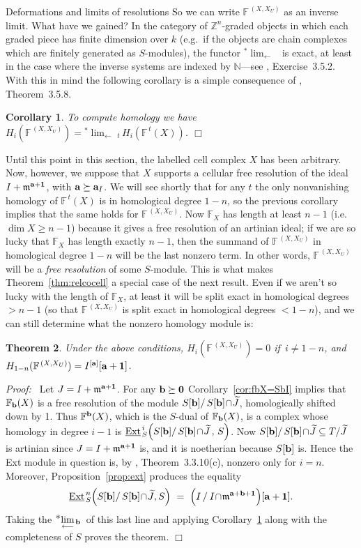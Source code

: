 \documentclass[12pt,leqno]{article}
\newtheorem{thm}{Theorem}[section]
\newtheorem{cor}[thm]{Corollary}
\def\Ast{{\textstyle \ast}}
\def\invlim#1{{{\displaystyle \lim_{\longleftarrow}}\;\!_{#1}\,}}
\def\eext{{{\underline{\rm Ext}}{\scriptscriptstyle \,}}}
\def\aa{{{\rm \bf a}}}
\def\bb{{{\rm \bf b}}}
\def\mm{{\mathfrak m}}
\def\FF{{\mathbb F}}
\def\NN{{\mathbb N}}
\def\ZZ{{\mathbb Z}}
\begin{document}
\begin{section}{Deformations and limits of resolutions}
So we can write $\FF^{\,(X,X_U)}$ as an inverse limit.  What have we
gained?  In the category of $\ZZ^n$-graded objects in which each graded
piece has finite dimension over $k$ (e.g.\ if the objects are chain
complexes which are finitely generated as $S$-modules), the functor
$^\Ast\invlim{}$ is exact, at least in the case where the inverse systems
are indexed by $\NN$---see \cite{Wei}, Exercise~3.5.2.  With this in mind
the following corollary is a simple consequence of \cite{Wei},
Theorem~3.5.8.

\begin{cor} \label{cor:homology}
To compute homology we have $H_i(\FF^{\,(X,X_U)}) =
{}^\Ast\invlim{t}H_i(\FF^{\,t}(X))$. \hfill $\Box$
\end{cor}

Until this point in this section, the labelled cell complex $X$ has been
arbitrary.  Now, however, we suppose that $X$ supports a cellular free
resolution of the ideal $I + \mm^{\aa + {\bf 1}}$, with $\aa \succeq
\aa_I$.  We will see shortly that for any $t$ the only nonvanishing
homology of $\FF^{\,t}(X)$ is in homological degree $1-n$, so the
previous corollary implies that the same holds for $\FF^{\,(X,X_U)}$.
Now $\FF_X$ has length at least $n-1$ (i.e. $\dim X \geq n-1$) because it
gives a free resolution of an artinian ideal; if we are so lucky that
$\FF_X$ has length exactly $n-1$, then the summand of $\FF^{\,(X,X_U)}$
in homological degree $1-n$ will be the last nonzero term.  In other
words, $\FF^{\,(X,X_U)}$ will be a \emph{free resolution} of some
$S$-module.  This is what makes Theorem~\ref{thm:relcocell} a special
case of the next result.  Even if we aren't so lucky with the length of
$\FF_X$, at least it will be split exact in homological degrees $> n-1$
(so that $\FF^{\,(X,X_U)}$ is split exact in homological degrees $<
1-n$), and we can still determine what the nonzero homology module is:
\begin{thm} \label{thm:coresolution}
Under the above conditions, $H_i(\FF^{\,(X,X_U)}) = 0$ if $\,i \neq 1-n$,
and $H_{1-n}(\FF^{\,(X,X_U)}) = I^{[\aa]}[\aa + {\bf 1}]$.
\end{thm}
{\it Proof:\ } Let $J = I + \mm^{\aa + {\bf 1}}$.  For any $\bb \succeq
{\bf 0}$ Corollary~\ref{cor:fbX=SbI} implies that $\FF_\bb(X)$ is a free
resolution of the module $S[\bb]/\,S[\bb]\!\cap\!\widetilde{J}$,
homologically shifted down by 1.  Thus $\FF^\bb(X)$, which is the
$S$-dual of $\FF_\bb(X)$, is a complex whose homology in degree $i-1$ is
$\eext^i_S\Bigl( S[\bb]/ \,S[\bb]\!\cap\!\widetilde{J}\,,\,S\Bigr)$.  Now
$S[\bb]/\,S[\bb] \!\cap\!\widetilde{J} \subseteq T / \widetilde{J}$ is
artinian since $J = I + \mm^{\aa + {\bf 1}}$ is, and it is noetherian
because $S[\bb]$ is.  Hence the Ext module in question is, by \cite{BH},
Theorem~3.3.10(c), nonzero only for $i = n$.  Moreover,
Proposition~\ref{prop:ext} produces the equality
$$
  \eext^n_S \Bigl( S[\bb]/ \,S[\bb]\!\cap\!\widetilde{J}, S \Bigr) \ = \
  \Bigl(I\,/\:I\!\cap\!\mm^{\aa + \bb + {\bf 1}}\Bigr)[\aa + {\bf 1}].
$$
Taking the ${}^\Ast\invlim{\bb}$ of this last line and applying
Corollary~\ref{cor:homology} along with the completeness of $S$ proves
the theorem.
%
\hfill
$\Box$
\vskip 2mm



\end{section}
\end{document}
